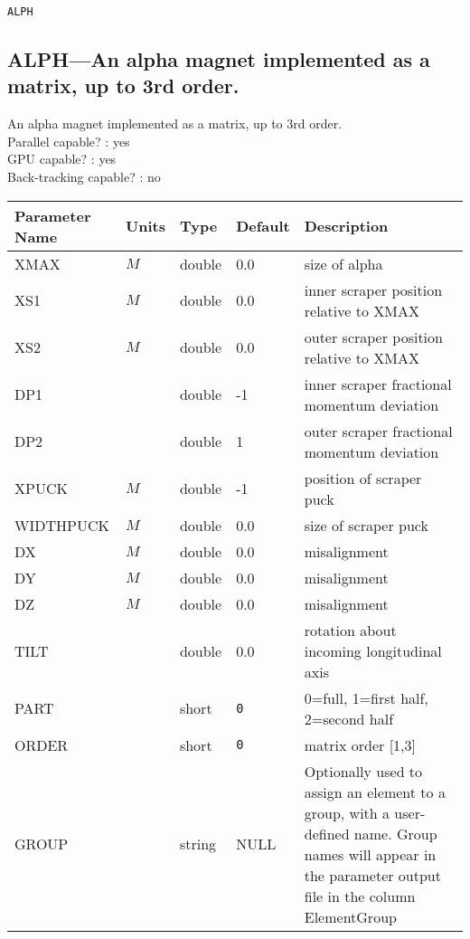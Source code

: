 \newlength{\descwidth}
\setlength{\descwidth}{2in}
\newpage
\begin{center}{\Large\verb|ALPH|}\end{center}
\subsection{ALPH---An alpha magnet implemented as a matrix, up to 3rd order.}
An alpha magnet implemented as a matrix, up to 3rd order.
\\
Parallel capable? : yes\\
GPU capable? : yes\\
Back-tracking capable? : no\\
\begin{tabular}{|l|l|l|l|p{\descwidth}|} \hline
Parameter Name & Units & Type & Default & Description \\ \hline 
XMAX & $M$ & double &  0.0 & size of alpha  \\ \hline 
XS1 & $M$ & double &  0.0 & inner scraper position relative to XMAX  \\ \hline 
XS2 & $M$ & double &  0.0 & outer scraper position relative to XMAX  \\ \hline 
DP1 &  & double &   -1 & inner scraper fractional momentum deviation  \\ \hline 
DP2 &  & double &   1 & outer scraper fractional momentum deviation  \\ \hline 
XPUCK & $M$ & double &   -1 & position of scraper puck  \\ \hline 
WIDTHPUCK & $M$ & double &  0.0 & size of scraper puck  \\ \hline 
DX & $M$ & double &  0.0 & misalignment  \\ \hline 
DY & $M$ & double &  0.0 & misalignment  \\ \hline 
DZ & $M$ & double &  0.0 & misalignment  \\ \hline 
TILT &  & double &  0.0 & rotation about incoming longitudinal axis  \\ \hline 
PART &  & short &  \verb|0| & 0=full, 1=first half, 2=second half  \\ \hline 
ORDER &  & short &  \verb|0| & matrix order [1,3]  \\ \hline 
GROUP &  & string & NULL & Optionally used to assign an element to a group, with a user-defined name.  Group names will appear in the parameter output file in the column ElementGroup  \\ \hline 
\end{tabular}

